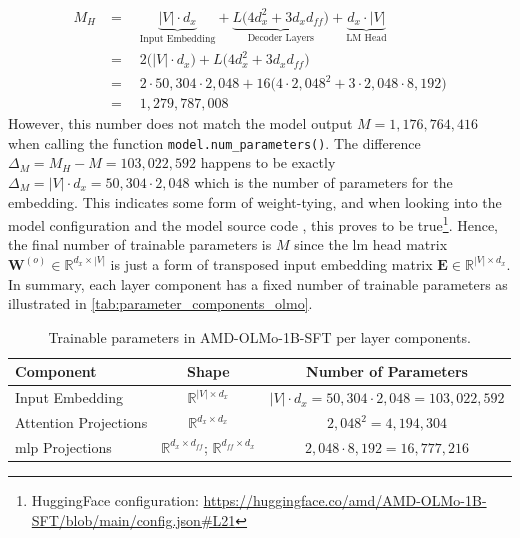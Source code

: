 \begin{align*}
    M_H &=\quad \underbrace{|V| \cdot d_x}_{\text{Input Embedding}} 
    + \underbrace{L \big( 4 d_x^2 + 3 d_x d_{ff} \big)}_{\text{Decoder Layers}}
    + \underbrace{d_x \cdot |V|}_{\text{LM Head}} \\
    &=\quad 2 \bigl( |V| \cdot d_x \bigr)
    + L \big( 4 d_x^2 + 3 d_x d_{ff} \big) \\
    &=\quad 2 \cdot 50{,}304 \cdot 2{,}048 + 16 \bigl(4 \cdot 2{,}048^2 + 3 \cdot 2{,}048 \cdot 8{,}192 \bigr) \\
    &=\quad 1{,}279{,}787{,}008
\end{align*}
However, this number does not match the model output $M = 1{,}176{,}764{,}416$ when calling the function \texttt{model.num\_parameters()}. The difference $\Delta_M = M_H - M = 103{,}022{,}592$ happens to be exactly $\Delta_M = |V| \cdot d_x = 50{,}304 \cdot 2{,}048$ which is the number of parameters for the embedding. This indicates some form of weight-tying, and when looking into the model configuration and the model source code \cite{DBLP:conf/acl/GroeneveldBWBKT24}, this proves to be true\footnote{HuggingFace configuration: \url{https://huggingface.co/amd/AMD-OLMo-1B-SFT/blob/main/config.json\#L21}}. Hence, the final number of trainable parameters is $M$ since the \acrshort{lm} head matrix $\mathbf{W}^{(o)} \in \mathbb{R}^{d_x \times |V|}$ is just a form of transposed input embedding matrix $\mathbf{E} \in \mathbb{R}^{|V| \times d_x}$. In summary, each layer component has a fixed number of trainable parameters as illustrated in \autoref{tab:parameter_components_olmo}.
\begin{table}[htb]
    \centering
    \begin{tabular}{|l|c|c|}
        \hline
        \textbf{Component} & \textbf{Shape} & \textbf{Number of Parameters} \\
        \hline
        Input Embedding & $\mathbb{R}^{|V| \times d_x}$ & $|V| \cdot d_x = 50{,}304 \cdot 2{,}048 = 103{,}022{,}592$ \\
        Attention Projections & $\mathbb{R}^{d_x \times d_x}$ & $2{,}048^2 = 4{,}194{,}304$ \\
        \acrshort{mlp} Projections & $\mathbb{R}^{d_x \times d_{ff}}$; $\mathbb{R}^{d_{ff} \times d_x}$ & $2{,}048 \cdot 8{,}192 = 16{,}777{,}216$ \\
        \hline
    \end{tabular}
    \caption{Trainable parameters in AMD-OLMo-1B-SFT per layer components.}
    \label{tab:parameter_components_olmo}
\end{table}

